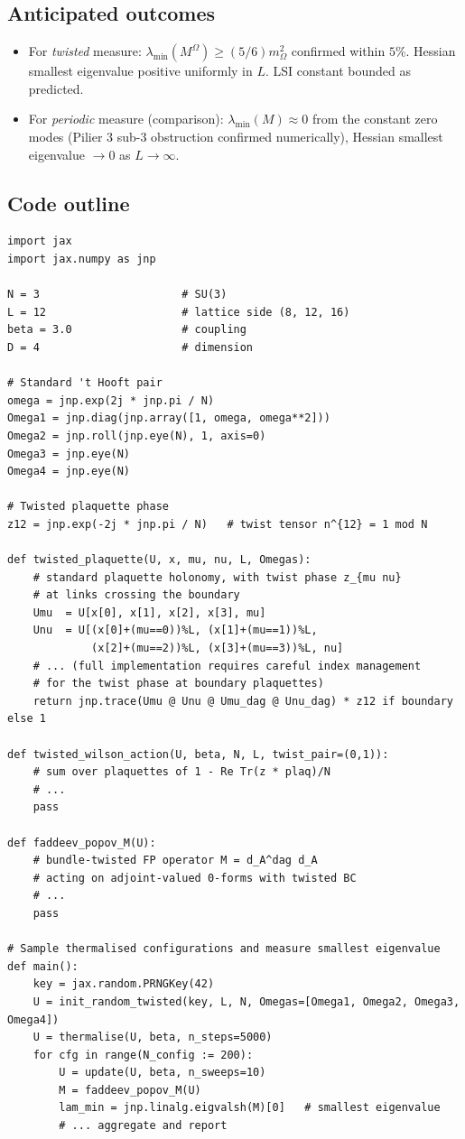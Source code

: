 \documentclass[11pt,a4paper]{amsart}
\theoremstyle{definition}
\begin{document}
\subsection{Anticipated outcomes}
\begin{itemize}[leftmargin=2em]
\item For \emph{twisted} measure: $\lambda_{\min}(M^\Omega) \geq (5/6)
m_\Omega^2$ confirmed within $5\%$. Hessian smallest eigenvalue
positive uniformly in $L$. LSI constant bounded as predicted.
\item For \emph{periodic} measure (comparison): $\lambda_{\min}(M) \approx
0$ from the constant zero modes (Pilier 3 sub-3 obstruction confirmed
numerically), Hessian smallest eigenvalue $\to 0$ as $L\to\infty$.
\end{itemize}

\subsection{Code outline}
\begin{verbatim}
import jax
import jax.numpy as jnp

N = 3                      # SU(3)
L = 12                     # lattice side (8, 12, 16)
beta = 3.0                 # coupling
D = 4                      # dimension

# Standard 't Hooft pair
omega = jnp.exp(2j * jnp.pi / N)
Omega1 = jnp.diag(jnp.array([1, omega, omega**2]))
Omega2 = jnp.roll(jnp.eye(N), 1, axis=0)
Omega3 = jnp.eye(N)
Omega4 = jnp.eye(N)

# Twisted plaquette phase
z12 = jnp.exp(-2j * jnp.pi / N)   # twist tensor n^{12} = 1 mod N

def twisted_plaquette(U, x, mu, nu, L, Omegas):
    # standard plaquette holonomy, with twist phase z_{mu nu}
    # at links crossing the boundary
    Umu  = U[x[0], x[1], x[2], x[3], mu]
    Unu  = U[(x[0]+(mu==0))%L, (x[1]+(mu==1))%L,
             (x[2]+(mu==2))%L, (x[3]+(mu==3))%L, nu]
    # ... (full implementation requires careful index management
    # for the twist phase at boundary plaquettes)
    return jnp.trace(Umu @ Unu @ Umu_dag @ Unu_dag) * z12 if boundary else 1

def twisted_wilson_action(U, beta, N, L, twist_pair=(0,1)):
    # sum over plaquettes of 1 - Re Tr(z * plaq)/N
    # ...
    pass

def faddeev_popov_M(U):
    # bundle-twisted FP operator M = d_A^dag d_A
    # acting on adjoint-valued 0-forms with twisted BC
    # ...
    pass

# Sample thermalised configurations and measure smallest eigenvalue
def main():
    key = jax.random.PRNGKey(42)
    U = init_random_twisted(key, L, N, Omegas=[Omega1, Omega2, Omega3, Omega4])
    U = thermalise(U, beta, n_steps=5000)
    for cfg in range(N_config := 200):
        U = update(U, beta, n_sweeps=10)
        M = faddeev_popov_M(U)
        lam_min = jnp.linalg.eigvalsh(M)[0]   # smallest eigenvalue
        # ... aggregate and report
\end{verbatim}
\end{document}
